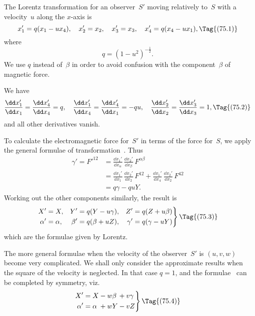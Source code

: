 \documentclass[12pt]{book}
\begin{document}
%
%

The Lorentz transformation for an observer~$S'$ moving relatively to~$S$ with
a velocity~$u$ along the $x$-axis is
\[
x_{1}' = q(x_1 - u x_4),\quad
x_{2}' = x_2,\quad
x_{3}' = x_3,\quad
x_{4}' = q(x_4 - u x_1),
\Tag{(75.1)}
\]
where
\[
q = (1 - u^2)^{-\frac{1}{2}}.
\]
We use $q$ instead of~$\beta$ in order to avoid confusion with the component~$\beta$ of
magnetic force.
%
%

We have
\[
\frac{\dd x_{1}'}{\dd x_{1}} = \frac{\dd x_{4}'}{\dd x_{4}} = q,\quad
\frac{\dd x_{1}'}{\dd x_{4}} = \frac{\dd x_{4}'}{\dd x_{1}} = -qu,\quad
\frac{\dd x_{2}'}{\dd x_{2}} = \frac{\dd x_{3}'}{\dd x_{3}} = 1,
\Tag{(75.2)}
\]
and all other derivatives vanish.

To calculate the electromagnetic force for~$S'$ in terms of the force for~$S$,
we apply the general formulae of transformation~. Thus
\begin{align*}
  \gamma' = F'^{12}
  &= \frac{\dd x_{1}'}{\dd x_{\alpha}}\, \frac{\dd x_{2}'}{\dd x_{\beta}}\, F^{\alpha\beta} \\
  &= \frac{\dd x_{1}'}{\dd x_{1}}\, \frac{\dd x_{2}'}{\dd x_{2}}\, F^{12}
   + \frac{\dd x_{1}'}{\dd x_{4}}\, \frac{\dd x_{2}'}{\dd x_{2}}\, F^{42} \\
  &= q\gamma - quY.
\end{align*}
Working out the other components similarly, the result is
\[
\left.
\begin{aligned}
  X' &= X, & Y' &= q(Y - u\gamma), & Z' &= q(Z + u\beta)\\
  \alpha' &= \alpha, & \beta' &= q(\beta + uZ), & \gamma' &= q(\gamma - uY)
\end{aligned}
\right\}
\Tag{(75.3)}
\]
which are the formulae given by Lorentz.

The more general formulae when the velocity of the observer~$S'$ is $(u, v, w)$
become very complicated. We shall only consider the approximate results
when the square of the velocity is neglected. In that case $q = 1$, and the
formulae~ can be completed by symmetry, viz.\
\[
\left.
\begin{alignedat}{3}
  X' &= X &&- w\beta &&+ v\gamma\\
  \alpha' &= \alpha &&+ wY &&- vZ
\end{alignedat}
\right\}
\Tag{(75.4)}
\]
\end{document}
